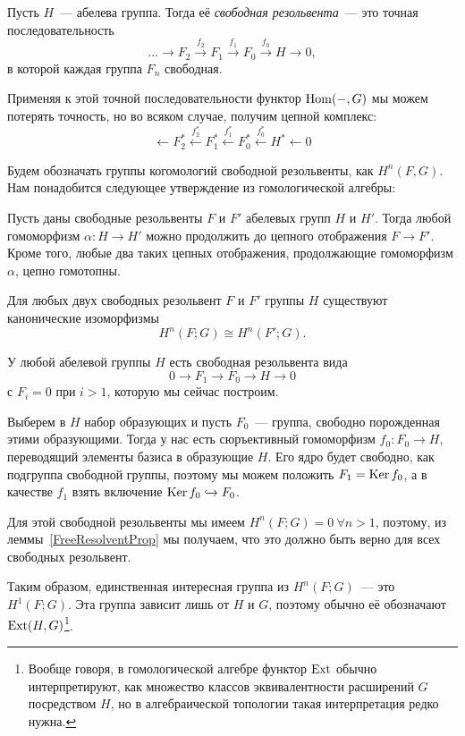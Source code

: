     \begin{definition}
        Пусть $H$~--- абелева группа. Тогда её \emph{свободная резольвента}~--- это точная последовательность
        \[ \ldots \to F_{2} \xrightarrow{f_2} F_{1} \xrightarrow{f_1} F_0 \xrightarrow{f_0} H \to 0, \]
        в которой каждая группа $F_n$ свободная.
    \end{definition}

    Применяя к этой точной последовательности функтор $\operatorname{Hom}(-, G)$  мы можем потерять точность, но во всяком случае, получим цепной комплекс:
    \[ \leftarrow F_2^* \xleftarrow{f_2^*} F_1^* \xleftarrow{f_1^*} F_0^* \xleftarrow{f_0^*} H^* \leftarrow 0\]

    Будем обозначать группы когомологий свободной резольвенты, как $H^n(F, G)$. Нам понадобится следующее утверждение из гомологической алгебры:

    \begin{lemma}\label{FreeResolventProp}
        Пусть даны свободные резольвенты $F$ и $F'$ абелевых групп $H$ и $H'$. Тогда любой гомоморфизм $\alpha\colon H \to H'$
        можно продолжить до цепного отображения $F \to F'$. Кроме того, любые два таких цепных отображения, продолжающие гомоморфизм $\alpha$, цепно гомотопны.

        Для любых двух свободных резольвент $F$ и $F'$ группы $H$ существуют канонические изоморфизмы
        \[ H^n(F; G) \cong H^n(F'; G). \]
    \end{lemma}

    У любой абелевой группы $H$ есть свободная резольвента вида
    \[ 0 \to F_1 \to F_0 \to H \to 0 \]
    с $F_i = 0$ при $i > 1$, которую мы сейчас построим.

    Выберем в $H$ набор образующих и пусть $F_0$~--- группа, свободно порожденная этими образующими.
    Тогда у нас есть сюръективный гомоморфизм $f_0\colon F_0 \to H$, переводящий элементы базиса в образующие $H$. Его ядро будет свободно, как
    подгруппа свободной группы, поэтому мы можем положить $F_1 = \operatorname{Ker}{f_0}$, а в качестве $f_1$ взять включение $\operatorname{Ker}{f_0} \hookrightarrow F_0$.

    Для этой свободной резольвенты мы имеем $H^n(F; G) = 0 \ \forall n > 1$, поэтому, из леммы~\ref{FreeResolventProp}  мы получаем, что это
    должно быть верно для всех свободных резольвент.

    Таким образом, единственная интересная группа из $H^n(F; G)$~--- это $H^1(F; G)$. Эта группа зависит лишь от $H$ и $G$, поэтому
    обычно её обозначают $\operatorname{Ext}(H, G)$\footnote{Вообще говоря, в гомологической алгебре функтор $\operatorname{Ext}$ обычно интерпретируют, как множество классов эквивалентности расширений $G$ посредством $H$, но в алгебраической топологии такая интерпретация редко нужна. }.

